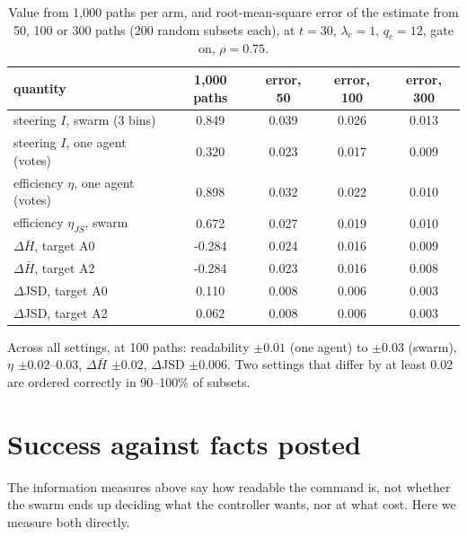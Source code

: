 \documentclass[10pt,a4paper]{article}
\begin{document}
\begin{table}[H]
\centering\small
\caption{Value from 1{,}000 paths per arm, and root-mean-square error of the estimate from 50, 100
or 300 paths (200 random subsets each), at $t = 30$, $\lambda_c = 1$, $q_c = 12$, gate on, $\rho = 0.75$.}
\label{tab:effprec}
\begin{tabular}{lcccc}
\toprule
quantity & 1{,}000 paths & error, 50 & error, 100 & error, 300 \\
\midrule
steering $I$, swarm (3 bins) & 0.849 & 0.039 & 0.026 & 0.013 \\
steering $I$, one agent (votes) & 0.320 & 0.023 & 0.017 & 0.009 \\
efficiency $\eta$, one agent (votes) & 0.898 & 0.032 & 0.022 & 0.010 \\
efficiency $\eta_{JS}$, swarm & 0.672 & 0.027 & 0.019 & 0.010 \\
$\Delta\bar H$, target A0 & -0.284 & 0.024 & 0.016 & 0.009 \\
$\Delta\bar H$, target A2 & -0.284 & 0.023 & 0.016 & 0.008 \\
$\Delta$JSD, target A0 & 0.110 & 0.008 & 0.006 & 0.003 \\
$\Delta$JSD, target A2 & 0.062 & 0.008 & 0.006 & 0.003 \\
\bottomrule
\end{tabular}
\end{table}

\noindent Across all settings, at 100 paths: readability $\pm0.01$ (one agent) to $\pm0.03$ (swarm),
$\eta$ $\pm0.02$--$0.03$, $\Delta\bar H$ $\pm0.02$, $\Delta$JSD $\pm0.006$. Two settings that differ by
at least 0.02 are ordered correctly in 90--100\% of subsets.

\section{Success against facts posted}\label{sec:success}

The information measures above say how readable the command is, not whether the swarm ends up
deciding what the controller wants, nor at what cost. Here we measure both directly.
\end{document}
